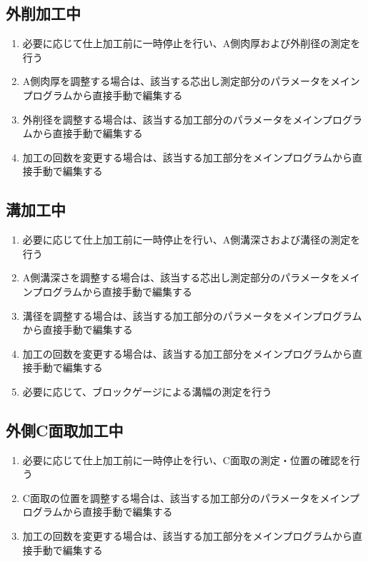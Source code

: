 \subsection{外削加工中}
\begin{enumerate}
\item 必要に応じて仕上加工前に一時停止を行い、A側肉厚および外削径の測定を行う
\item A側肉厚を調整する場合は、該当する芯出し測定部分のパラメータをメインプログラムから直接手動で編集する
\item 外削径を調整する場合は、該当する加工部分のパラメータをメインプログラムから直接手動で編集する
\item 加工の回数を変更する場合は、該当する加工部分をメインプログラムから直接手動で編集する
\end{enumerate}


\subsection{溝加工中}
\begin{enumerate}
\item 必要に応じて仕上加工前に一時停止を行い、A側溝深さおよび溝径の測定を行う
\item A側溝深さを調整する場合は、該当する芯出し測定部分のパラメータをメインプログラムから直接手動で編集する
\item 溝径を調整する場合は、該当する加工部分のパラメータをメインプログラムから直接手動で編集する
\item 加工の回数を変更する場合は、該当する加工部分をメインプログラムから直接手動で編集する
\item 必要に応じて、ブロックゲージによる溝幅の測定を行う
\end{enumerate}


\subsection{外側C面取加工中}
\begin{enumerate}
\item 必要に応じて仕上加工前に一時停止を行い、C面取の測定・位置の確認を行う
\item C面取の位置を調整する場合は、該当する加工部分のパラメータをメインプログラムから直接手動で編集する
\item 加工の回数を変更する場合は、該当する加工部分をメインプログラムから直接手動で編集する
\end{enumerate}


